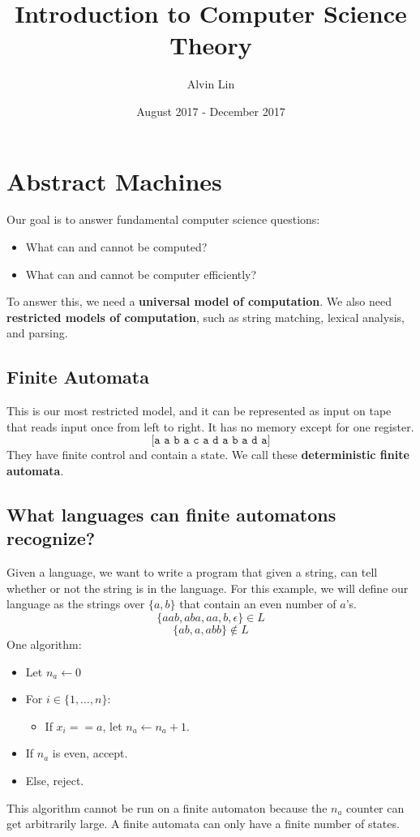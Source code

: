 \documentclass[letterpaper, 12pt]{math}
\title{Introduction to Computer Science Theory}
\author{Alvin Lin}
\date{August 2017 - December 2017}
\begin{document}
\maketitle

\section*{Abstract Machines}
Our goal is to answer fundamental computer science questions:
\begin{itemize}
  \item What can and cannot be computed?
  \item What can and cannot be computer efficiently?
\end{itemize}
To answer this, we need a \textbf{universal model of computation}. We also need
\textbf{restricted models of computation}, such as string matching, lexical
analysis, and parsing.

\subsection*{Finite Automata}
This is our most restricted model, and it can be represented as input on tape
that reads input once from left to right. It has no memory except for one
register.
\[ \texttt{[a a b a c a d a b a d a]} \]
They have finite control and contain a state. We call these
\textbf{deterministic finite automata}.

\subsection*{What languages can finite automatons recognize?}
Given a language, we want to write a program that given a string, can tell
whether or not the string is in the language. For this example, we will define
our language as the strings over \( \{a,b\} \) that contain an even number of
\( a \)'s.
\[ \{aab,aba,aa,b,\epsilon\}\in L \]
\[ \{ab,a,abb\}\notin L \]
One algorithm:
\begin{itemize}
  \item Let \( n_a \leftarrow 0 \)
  \item For \( i\in\{1,\dots,n\} \):
  \begin{itemize}
    \item If \( x_i == a \), let \( n_a\leftarrow n_a+1 \).
  \end{itemize}
  \item If \( n_a \) is even, accept.
  \item Else, reject.
\end{itemize}
This algorithm cannot be run on a finite automaton because the \( n_a \)
counter can get arbitrarily large. A finite automata can only have a finite
number of states.
\end{document}
